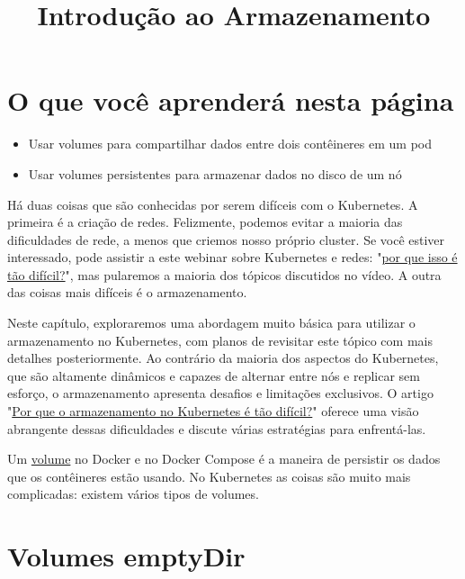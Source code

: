 \documentclass[11pt,a4paper]{article}
\title{\textbf{Introdução ao Armazenamento}}
\date{}
\begin{document}
\maketitle

\tableofcontents
\vspace{1em}

\section{O que você aprenderá nesta página}
\begin{itemize}
    \item Usar volumes para compartilhar dados entre dois contêineres em um pod
    \item Usar volumes persistentes para armazenar dados no disco de um nó
\end{itemize}

Há duas coisas que são conhecidas por serem difíceis com o Kubernetes. A primeira é a criação de redes. Felizmente, podemos evitar a maioria das dificuldades de rede, a menos que criemos nosso próprio cluster. Se você estiver interessado, pode assistir a este webinar sobre Kubernetes e redes: "\href{https://www.youtube.com/watch?v=GgCA2USI5iQ}{por que isso é tão difícil?}", mas pularemos a maioria dos tópicos discutidos no vídeo. A outra das coisas mais difíceis é o armazenamento.

Neste capítulo, exploraremos uma abordagem muito básica para utilizar o armazenamento no Kubernetes, com planos de revisitar este tópico com mais detalhes posteriormente. Ao contrário da maioria dos aspectos do Kubernetes, que são altamente dinâmicos e capazes de alternar entre nós e replicar sem esforço, o armazenamento apresenta desafios e limitações exclusivos. O artigo "\href{https://softwareengineeringdaily.com/articles/why-is-storage-on-kubernetes-is-so-hard/}{Por que o armazenamento no Kubernetes é tão difícil?}" oferece uma visão abrangente dessas dificuldades e discute várias estratégias para enfrentá-las.

Um \href{https://docs.docker.com/engine/storage/volumes/}{volume} no Docker e no Docker Compose é a maneira de persistir os dados que os contêineres estão usando. No Kubernetes as coisas são muito mais complicadas: existem vários tipos de volumes.

\section{Volumes emptyDir}
\end{document}
